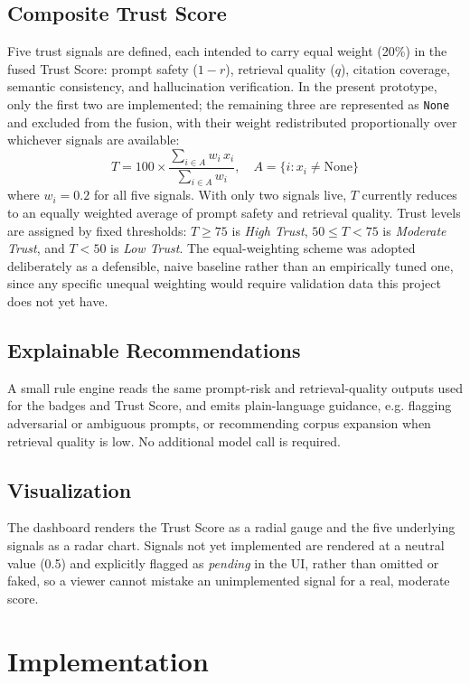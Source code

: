 \documentclass[conference]{IEEEtran}
\begin{document}
\subsection{Composite Trust Score}
Five trust signals are defined, each intended to carry equal weight (20\%) in the fused
Trust Score: prompt safety ($1{-}r$), retrieval quality ($q$), citation coverage,
semantic consistency, and hallucination verification. In the present prototype, only
the first two are implemented; the remaining three are represented as \texttt{None} and
excluded from the fusion, with their weight redistributed proportionally over whichever
signals are available:
\begin{equation}
T = 100 \times \frac{\sum_{i \in A} w_i \, x_i}{\sum_{i \in A} w_i}, \quad A = \{i : x_i \neq \text{None}\}
\end{equation}
where $w_i{=}0.2$ for all five signals. With only two signals live, $T$ currently
reduces to an equally weighted average of prompt safety and retrieval quality. Trust
levels are assigned by fixed thresholds: $T \geq 75$ is \emph{High Trust}, $50 \leq T <
75$ is \emph{Moderate Trust}, and $T < 50$ is \emph{Low Trust}. The equal-weighting
scheme was adopted deliberately as a defensible, naive baseline rather than an
empirically tuned one, since any specific unequal weighting would require validation
data this project does not yet have.

\subsection{Explainable Recommendations}
A small rule engine reads the same prompt-risk and retrieval-quality outputs used for
the badges and Trust Score, and emits plain-language guidance, e.g. flagging adversarial
or ambiguous prompts, or recommending corpus expansion when retrieval quality is low.
No additional model call is required.

\subsection{Visualization}
The dashboard renders the Trust Score as a radial gauge and the five underlying signals
as a radar chart. Signals not yet implemented are rendered at a neutral value (0.5) and
explicitly flagged as \emph{pending} in the UI, rather than omitted or faked, so a viewer
cannot mistake an unimplemented signal for a real, moderate score.

\section{Implementation}
\end{document}
